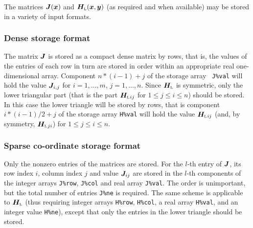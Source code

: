 \documentclass{galahad}
\newcommand{\bmHL}{\bmH\sub{L}}
\begin{document}

\galmatrix The matrices ${\bm{J}}({\bm{x}})$ and $\bmHL(\bmx,\bmy)$
(as required and when available) may be stored in a variety of input formats.

\subsubsection{Dense storage format}\label{dense}
The matrix ${\bm{J}}$ is stored as a compact
dense matrix by rows, that is, the values of the entries of each row in turn are
stored in order within an appropriate real one-dimensional array.
Component $n \ast (i-1) + j$ of the storage array {\tt
  J\%val} will hold the value ${\bm{J}}_{i,j}$ for $i = 1, \ldots , m$, $j =
1, \ldots , n$.  Since $\bmHL$ is symmetric, only the lower triangular
part (that is the part $\bmHL{}_{ij}$ for $1 \leq j \leq i \leq n$)
should be stored. In this case the lower triangle will be stored by rows,
that is component $i \ast (i-1)/2 + j$ of the storage array {\tt H\%val} will
hold the value $\bmHL{}_{ij}$ (and, by symmetry, $\bmHL{}_{ji}$) for 
$1 \leq j \leq i \leq n$. 

\subsubsection{Sparse co-ordinate storage format}\label{coordinate}
Only the nonzero entries of the matrices are stored. For the $l$-th
entry of ${\bm{J}}$, its row index $i$, column index $j$ and value
${\bm{J}}_{ij}$ are stored in the $l$-th components of the integer arrays
{\tt J\%row}, {\tt J\%col} and real array {\tt J\%val}.
The order is unimportant, but the total number of entries {\tt J\%ne} is
required.  The same scheme is applicable to $\bmHL$
(thus requiring integer arrays {\tt H\%row}, {\tt H\%col}, a real
array {\tt H\%val}, and an integer value {\tt H\%ne}), except that only
the entries in the lower triangle should be stored.

\end{document}
